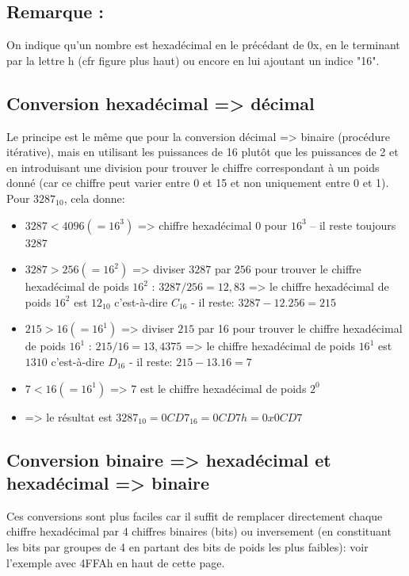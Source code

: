 \subsection{Remarque :}
On indique qu’un nombre est hexadécimal en le précédant de 0x, en le terminant par la lettre h (cfr figure plus haut) ou encore en lui ajoutant un indice "16".


\subsection{Conversion hexadécimal => décimal}
Le principe est le même que pour la conversion décimal => binaire (procédure itérative), mais en utilisant les puissances de 16 plutôt que les puissances de 2 et en introduisant une division pour trouver le chiffre correspondant à un poids donné (car ce chiffre peut varier entre 0 et 15 et non uniquement entre 0 et 1).\\

Pour $3287_{10}$, cela donne:
\vspace{2mm}
\begin{itemize}
\item $3287 < 4096 (= 16^3)$ => chiffre hexadécimal $0$ pour $16^3$ – il reste toujours $3287$
\item $3287 > 256 (= 16^2)$ => diviser $3287$ par $256$ pour trouver le chiffre hexadécimal de poids $16^2$ : $3287/256=12,83$ => le chiffre hexadécimal de poids $16^2$ est $12_{10}$ c'est-à-dire $C_{16}$ - il reste: $3287-12.256 = 215$
\item $215 > 16 (= 16^1)$ => diviser $215$ par 16 pour trouver le chiffre hexadécimal de poids $16^1$ : $215/16=13,4375$ => le chiffre hexadécimal de poids $16^1$ est $1310$ c'est-à-dire $D_{16}$ - il reste: $215-13.16 = 7$
\item $7 < 16 (= 16^1)$ => 7 est le chiffre hexadécimal de poids $2^0$
\item => le résultat est $3287_{10} = 0CD7_{16} = 0CD7h = 0x0CD7$
\end{itemize}

\subsection{Conversion binaire => hexadécimal et hexadécimal => binaire}
Ces conversions sont plus faciles car il suffit de remplacer directement chaque chiffre hexadécimal par 4 chiffres binaires (bits) ou inversement (en constituant les bits par groupes de 4 en partant des bits de poids les plus faibles): voir l'exemple avec 4FFAh en haut de cette page.


